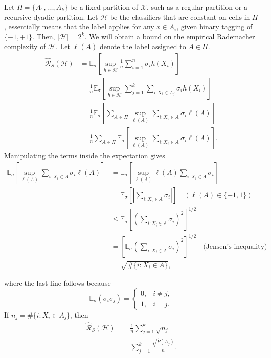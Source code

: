 \begin{example}
Let $\Pi=\{A_1, \dots,A_k\}$ be a fixed partition of $\mathcal{X}$, such as a regular partition or a recursive dyadic partition. Let $\mathcal{H}$ be the classifiers that are constant on cells in $\Pi$, essentially means that the label applies for any $x\in A_{i}$, given binary tagging of $\{-1,+1\}$. Then, $\lvert\mathcal{H}\rvert=2^k$. We will obtain a bound on the empirical Rademacher complexity of $\mathcal{H}$. Let $\ell (A)$ denote the label assigned to $A\in \Pi$. 
\begin{align*}
    \widehat{\mathcal{R}}_S(\mathcal{H}) 
    &= \mathbb{E}_\sigma \left[ \sup_{h \in \mathcal{H}} \frac{1}{n} \sum_{i=1}^n \sigma_i h(X_i) \right] \\
    &= \frac{1}{n} \mathbb{E}_\sigma \left[ \sup_{h \in \mathcal{H}} \sum_{j=1}^k \sum_{i: X_i \in A_j} \sigma_i h(X_i) \right] \\
    &= \frac{1}{n} \mathbb{E}_\sigma \left[ \sum_{A \in \Pi} \sup_{\ell(A)} \sum_{i: X_i \in A} \sigma_i \ell(A) \right] \\
    &= \frac{1}{n} \sum_{A \in \Pi} \mathbb{E}_\sigma \left[ \sup_{\ell(A)} \sum_{i: X_i \in A} \sigma_i \ell(A) \right].
\end{align*}
Manipulating the terms inside the expectation gives
\begin{align*}
    \mathbb{E}_\sigma \left[ \sup_{\ell(A)} \sum_{i: X_i \in A} \sigma_i \ell(A) \right] 
    &= \mathbb{E}_\sigma \left[ \sup_{\ell(A)} \ell(A) \sum_{i: X_i \in A} \sigma_i \right] \\
    &= \mathbb{E}_\sigma \left[ \left| \sum_{i: X_i \in A} \sigma_i \right| \right] \quad (\ell(A) \in \{-1, 1\}) \\
    &\le \mathbb{E}_\sigma \left[ \left( \sum_{i: X_i \in A} \sigma_i \right)^2 \right]^{1/2} \\
    &= \left[ \mathbb{E}_\sigma \left( \sum_{i: X_i \in A} \sigma_i \right)^2 \right]^{1/2} \quad \text{(Jensen's inequality)} \\
    &= \sqrt{\#\{i : X_i \in A\}},
\end{align*}

where the last line follows because 
$$
\mathbb{E}_\sigma (\sigma_i \sigma_j) = 
\begin{cases}
    0, & i \ne j, \\
    1, & i = j.
\end{cases}
$$
If $ n_j = \#\{i : X_i \in A_j\}$, then
\begin{align*}
    \widehat{\mathcal{R}}_S(\mathcal{H}) 
    &= \frac{1}{n} \sum_{j=1}^k \sqrt{n_j} \\
    &= \sum_{j=1}^k \frac{\sqrt{\widehat{P}(A_j)}}{n}.
\end{align*}

\end{example}

